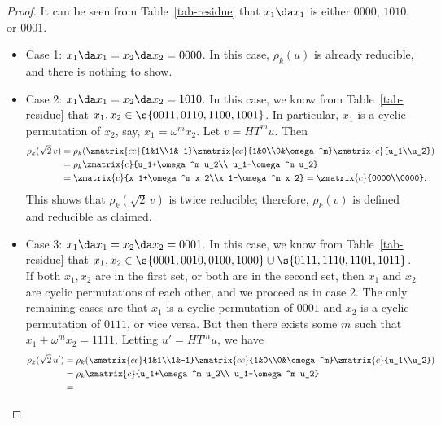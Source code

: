 \begin{proof}
  It can be seen from Table~\vref{tab-residue} that $x_1\da x_1$ is either $0000$, $1010$, or $0001$.
  \begin{itemize}
  \item Case 1: $x_1\da x_1 = x_2\da x_2 = 0000$. In this case, $\rho_k(u)$ is already reducible,
    and there is nothing to show.
  \item Case 2: $x_1\da x_1 = x_2\da x_2 = 1010$. In this case, we know from
    Table~\vref{tab-residue} that $x_1,x_2\in\s{0011, 0110, 1100, 1001}$. In particular, $x_1$ is a
    cyclic permutation of $x_2$, say, $x_1=\omega^m x_2$. Let $v=HT^mu$. Then
    \[
      \begin{split}
        \rho_k(\sqrt{2}\,v) &=
        \rho_k(\zmatrix{cc}{1&1\\1&-1}\zmatrix{cc}{1&0\\0&\omega^m}\zmatrix{c}{u_1\\u_2})
        \\&= \rho_k\zmatrix{c}{u_1+\omega^m u_2\\ u_1-\omega^m u_2} \\&=
        \zmatrix{c}{x_1+\omega^m x_2\\x_1-\omega^m x_2} =
        \zmatrix{c}{0000\\0000}.
      \end{split}
    \]
    This shows that $\rho_k(\sqrt{2}\,v)$ is twice reducible; therefore, $\rho_k(v)$ is defined and
    reducible as claimed.
  \item Case 3: $x_1\da x_1 = x_2\da x_2 = 0001$. In this case, we know from Table~\vref{tab-residue}
    that $x_1,x_2\in\s{0001,0010,0100,1000}\cup\s{0111,1110,1101,1011}$. If both $x_1,x_2$ are in
    the first set, or both are in the second set, then $x_1$ and $x_2$ are cyclic permutations of
    each other, and we proceed as in case 2. The only remaining cases are that $x_1$ is a cyclic
    permutation of $0001$ and $x_2$ is a cyclic permutation of $0111$, or vice versa. But then
    there exists some $m$ such that $x_1+\omega^mx_2=1111$. Letting $u'=HT^mu$, we have
    \[
      \begin{split}
        \rho_k(\sqrt{2}\,u') &=
        \rho_k(\zmatrix{cc}{1&1\\1&-1}\zmatrix{cc}{1&0\\0&\omega^m}\zmatrix{c}{u_1\\u_2})
        \\&= \rho_k\zmatrix{c}{u_1+\omega^m u_2\\ u_1-\omega^m u_2} \\&=

\end{split}\]
\end{itemize}
\end{proof}
